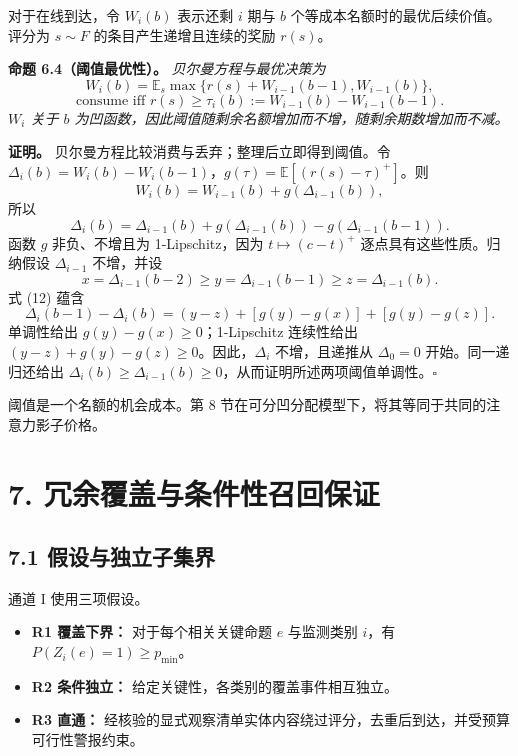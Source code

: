 \documentclass[
  chinese,
  11pt]{article}
\providecommand{\tightlist}{%
  \setlength{\itemsep}{0pt}\setlength{\parskip}{0pt}}
\begin{document}
对于在线到达，令 \(W_i(b)\) 表示还剩 \(i\) 期与 \(b\) 个等成本名额时的最优后续价值。评分为 \(s\sim F\) 的条目产生递增且连续的奖励 \(r(s)\)。

\textbf{命题 6.4（阈值最优性）。} \emph{贝尔曼方程与最优决策为} \[
W_i(b)=\mathbb E_s\max\{r(s)+W_{i-1}(b-1),W_{i-1}(b)\},
\] \[
\text{consume iff }r(s)\geq\tau_i(b):=W_{i-1}(b)-W_{i-1}(b-1).
\] \emph{\(W_i\) 关于 \(b\) 为凹函数，因此阈值随剩余名额增加而不增，随剩余期数增加而不减。}

\textbf{证明。} 贝尔曼方程比较消费与丢弃；整理后立即得到阈值。令 \(\Delta_i(b)=W_i(b)-W_i(b-1)\)，\(g(\tau)=\mathbb E[(r(s)-\tau)^+]\)。则 \[
W_i(b)=W_{i-1}(b)+g(\Delta_{i-1}(b)),
\] 所以 \[
\Delta_i(b)=\Delta_{i-1}(b)+g(\Delta_{i-1}(b))-g(\Delta_{i-1}(b-1)).
\tag{12}
\] 函数 \(g\) 非负、不增且为 1-Lipschitz，因为 \(t\mapsto(c-t)^+\) 逐点具有这些性质。归纳假设 \(\Delta_{i-1}\) 不增，并设 \[
x=\Delta_{i-1}(b-2)\geq y=\Delta_{i-1}(b-1)\geq z=\Delta_{i-1}(b).
\] 式 (12) 蕴含 \[
\Delta_i(b-1)-\Delta_i(b)
=(y-z)+[g(y)-g(x)]+[g(y)-g(z)].
\] 单调性给出 \(g(y)-g(x)\geq0\)；1-Lipschitz 连续性给出 \((y-z)+g(y)-g(z)\geq0\)。因此，\(\Delta_i\) 不增，且递推从 \(\Delta_0=0\) 开始。同一递归还给出 \(\Delta_i(b)\geq\Delta_{i-1}(b)\geq0\)，从而证明所述两项阈值单调性。\(\square\)

阈值是一个名额的机会成本。第 8 节在可分凹分配模型下，将其等同于共同的注意力影子价格。

\section{7. 冗余覆盖与条件性召回保证}\label{ux5197ux4f59ux8986ux76d6ux4e0eux6761ux4ef6ux6027ux53ecux56deux4fddux8bc1}

\subsection{7.1 假设与独立子集界}\label{ux5047ux8bbeux4e0eux72ecux7acbux5b50ux96c6ux754c}

通道 I 使用三项假设。

\begin{itemize}
\tightlist
\item
  \textbf{R1 覆盖下界：} 对于每个相关关键命题 \(e\) 与监测类别 \(i\)，有 \(P(Z_i(e)=1)\geq p_{\min}\)。
\item
  \textbf{R2 条件独立：} 给定关键性，各类别的覆盖事件相互独立。
\item
  \textbf{R3 直通：} 经核验的显式观察清单实体内容绕过评分，去重后到达，并受预算可行性警报约束。
\end{itemize}
\end{document}
